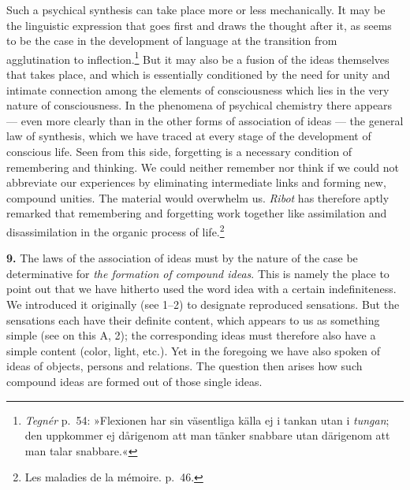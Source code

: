 \documentclass[12pt,a4paper]{book}
\begin{document}
Such a psychical synthesis can take place more or less mechanically. It
may be the linguistic expression that goes first and draws the thought
after it, as seems to be the case in the development of language at the
transition from
agglutination to inflection.\footnote{\emph{Tegnér} p.~54: »Flexionen
har sin väsentliga källa ej i tankan utan i \emph{tungan}; den uppkommer
ej dårigenom att man tänker snabbare utan därigenom att man talar
snabbare.«} But it may also be a fusion of the ideas themselves that
takes place, and which is essentially conditioned by the need for unity
and intimate connection among the elements of consciousness which lies
in the very nature of consciousness. In the phenomena of psychical
chemistry there appears --- even more clearly than in the other forms of
association of ideas --- the general law of synthesis, which we have
traced at every stage of the development of conscious life. Seen from
this side, forgetting is a necessary condition of remembering and
thinking. We could neither remember nor think if we could not abbreviate
our experiences by eliminating intermediate links and forming new,
compound unities. The material would overwhelm us. \emph{Ribot} has
therefore aptly remarked that remembering and forgetting work together
like assimilation and disassimilation in the organic process of
life.\footnote{Les maladies de la mémoire. p.~46.}

\textbf{9.} The laws of the association of ideas must by the nature of
the case be determinative for \emph{the formation of compound ideas}.
This is namely the place to point out that we have hitherto used the
word idea with a certain indefiniteness. We introduced it originally
(see 1--2) to designate reproduced sensations. But the sensations each
have their definite content, which appears to us as something simple
(see on this A, 2); the corresponding ideas must therefore also have a
simple content (color, light, etc.). Yet in the foregoing we have also
spoken of ideas of objects, persons and relations. The question then
arises how such compound ideas are formed out of those single ideas.
\end{document}
